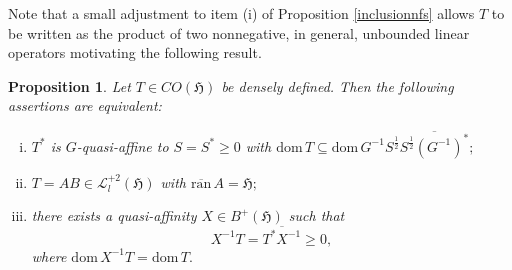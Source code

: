 \documentclass{amsart}
\newtheorem{proposition}[theorem]{Proposition}
\newcommand{\h}{\mathfrak{H}}
\newcommand{\ranbarA}{\mathrm{\overline{ran}}\, A}
\newcommand{\D}{\mathrm{dom}\,}
\newcommand{\DT}{\mathrm{dom}\,T }
\newcommand{\adj}{^*}
\newcommand{\inv}{^{-1}}
\newcommand{\tstar}{T^{*}}
\newcommand{\half}{^{\frac{1}{2}}}
\newcommand{\inclu}{\subseteq}
\newcommand{\lplus}{B^{+}(\h)}
\newcommand{\ldeux}{\mathcal{L}_l^{+2}(\h)}
\numberwithin{equation}{section}
\renewcommand{\labelenumi}{(\arabic{enumi})}
\begin{document}
Note that a small adjustment to item (i) of Proposition  \ref{inclusionnfs} allows
$T$  to be written as the product of two nonnegative, in general, unbounded  linear operators  motivating the following result.
%
%
\begin{proposition} \label{egalquasiaff}
  Let $T\in CO(\h) $ be densely defined. Then the following assertions are equivalent:
   \begin{enumerate}[(i)]\def\labelenumi{\rm(\roman{enumi})}
       \item  $\tstar$ is $G$-quasi-affine to  $S = S\adj \geq 0$ with $\D T \inclu  \D G\inv S\half \overline{S\half  (G\inv)\adj};$
       \item $T =  AB \in \ldeux$  with $\ranbarA =\h;$
        \item there exists a quasi-affinity $X \in \lplus$  such that
        $$
          X\inv T = \overline{\tstar X\inv}  \geq 0,
                   $$
                   where $ \D  X\inv T=\DT.$
   \end{enumerate}
\end{proposition}
%
\end{document}
